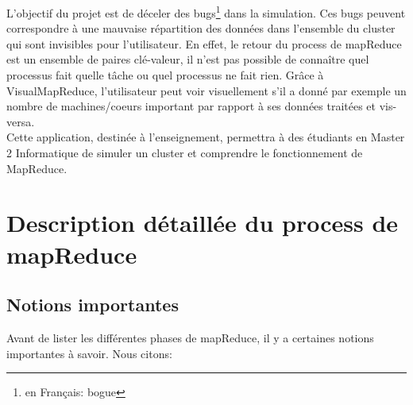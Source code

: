 L'objectif du projet est de déceler des bugs\footnote{en Français: bogue} dans la simulation.
Ces bugs peuvent correspondre à une mauvaise répartition des données dans l'ensemble  du cluster qui sont invisibles pour l'utilisateur. En effet, le retour du process de mapReduce est un ensemble de paires clé-valeur, il n'est pas possible de connaître quel processus fait quelle tâche ou quel processus ne fait rien. Grâce à VisualMapReduce, l'utilisateur peut voir visuellement s'il a donné par exemple un nombre de machines/coeurs important par rapport à ses données traitées et vis-versa.\\
Cette application, destinée à l'enseignement, permettra à des étudiants en Master 2 Informatique de simuler un cluster et comprendre le fonctionnement de MapReduce.

\section{Description détaillée du process de mapReduce}
\subsection{Notions importantes}

Avant de lister les différentes phases de mapReduce, il y a certaines notions importantes à savoir. Nous citons:\\

